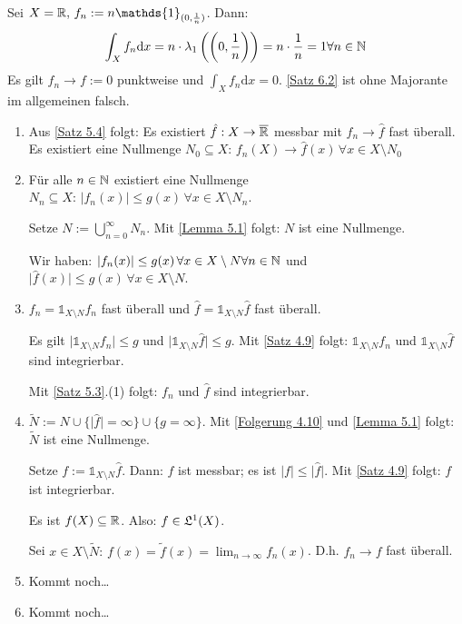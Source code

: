 \documentclass[a4paper,twoside,DIV15,BCOR12mm,chapterprefix=true,headings=onelinechapter]{scrbook}
\begin{document}
\begin{beispiel}
Sei \(X=\mdr,\,f_{n}:=n\mathds{1}_{(0,\frac{1}{n})}\). Dann:
\[
\int_{X}{f_{n}\mathrm{d}x}=n\cdot\lambda_{1}\left(\left(0,\frac{1}{n}\right)\right)=n\cdot\frac{1}{n}=1\forall n\in\mathbb{N}
\]
Es gilt \(f_{n}\to f:=0\) punktweise und \(\int_{X}{f_{n}\mathrm{d}x}=0\). \ref{Satz 6.2} ist ohne Majorante im allgemeinen
falsch.
\end{beispiel}

\begin{beweis}
\begin{enumerate}
\item Aus \ref{Satz 5.4} folgt: Es existiert \(\hat{f}:X\to\overline{\mathbb{R}}\) messbar mit \(f_{n}\to\hat{f}\) fast \"uberall.
Es existiert eine Nullmenge \(N_{0}\subseteq X:\,f_{n}(X)\to\hat{f}(x)\,\forall x\in X\setminus N_{0}\)
\item F\"ur alle \(n\in\mathbb{N}\) existiert eine Nullmenge \(N_{n}\subseteq X:\,\lvert f_{n}(x)\rvert\leq g(x)\,\forall x\in X\setminus N_{n}\).

Setze \(N:=\bigcup_{n=0}^{\infty}{N_{n}}\). Mit \ref{Lemma 5.1} folgt: \(N\) ist eine Nullmenge.

Wir haben: \(\lvert f_{n}(x)\rvert\leq g(x)\,\forall x\in X\setminus N\forall n\in\mathbb{N}\) und
\(\lvert\hat{f}(x)\rvert\leq g(x)\,\forall x\in X\setminus N\).
\item \(f_{n}=\mathds{1}_{X\setminus N}f_{n}\) fast \"uberall und \(\hat{f}=\mathds{1}_{X\setminus N}\hat{f}\)
fast \"uberall.

Es gilt \(\lvert\mathds{1}_{X\setminus N}f_{n}\rvert\leq g\) und \(\lvert\mathds{1}_{X\setminus N}\hat{f}\rvert\leq g\). Mit
\ref{Satz 4.9} folgt: \(\mathds{1}_{X\setminus N}f_{n}\) und \(\mathds{1}_{X\setminus N}\hat{f}\) sind integrierbar.

Mit \ref{Satz 5.3}.(1) folgt: \(f_{n}\) und \(\hat{f}\) sind integrierbar.
\item \(\tilde{N}:=N\cup\{\lvert\hat{f}\rvert=\infty\}\cup\{g=\infty\}\). Mit \ref{Folgerung 4.10} und \ref{Lemma 5.1} folgt:
\(\tilde{N}\) ist eine Nullmenge.

Setze \(f:=\mathds{1}_{X\setminus N}\hat{f}\). Dann: \(f\) ist messbar; es ist \(\lvert f\rvert\leq\lvert\hat{f}\rvert\).
Mit \ref{Satz 4.9} folgt: \(f\) ist integrierbar.

Es ist \(f(X)\subseteq\mathbb{R}\). Also: \(f\in\mathfrak{L}^{1}(X)\).

Sei \(x\in X\setminus\tilde{N}:\,f(x)=\tilde{f}(x)=\lim_{n\to\infty}f_{n}(x)\).
D.h. \(f_{n}\to f\) fast \"uberall.
\item Kommt noch\ldots
\item Kommt noch\ldots
\end{enumerate}
\end{beweis}
\end{document}
